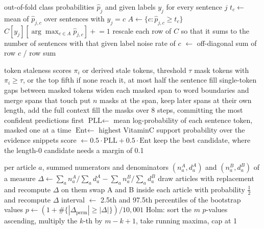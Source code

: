 \documentclass[]{paper}
\newcommand{\edit}{\textsc{edit}}
\begin{document}
\begin{algorithm}[H]
\caption{Confident-learning estimate of label noise, as reported in \texttt{audit/noise.json}.}
\label{alg:cl}
\begin{algorithmic}[1]
\Require out-of-fold class probabilities $\hat{p}_j$ and given labels $y_j$ for every sentence $j$
 $t_c \gets$ mean of $\hat{p}_{j,c}$ over sentences with $y_j = c$ \EndFor
{}
  \State $A \gets \{c : \hat{p}_{j,c} \ge t_c\}$
   $C[y_j][\arg\max_{c \in A} \hat{p}_{j,c}] \mathrel{+}= 1$ \EndIf
\EndFor
\State rescale each row of $C$ so that it sums to the number of sentences with that given label
 noise rate of $c$ $\gets$ off-diagonal sum of row $c$ / row sum \EndFor
\end{algorithmic}
\end{algorithm}

\begin{algorithm}[H]
\caption{Repair of one \edit{} sentence (\texttt{spans.policy\_spans}, \texttt{spans.snap}, \texttt{repair.repair\_sentence}).}
\label{alg:repair}
\begin{algorithmic}[1]
\Require token staleness scores $\pi_i$ or derived stale tokens, threshold $\tau$
\State mask tokens with $\pi_i \ge \tau$, or the top fifth if none reach it, at most half the sentence
\State fill single-token gaps between masked tokens
\State widen each masked span to word boundaries and merge spans that touch
    \State put $n$ masks at the span, keep later spans at their own length, add the full context
    \State fill the masks over 8 steps, committing the most confident predictions first
    \State $\text{PLL} \gets$ mean log-probability of each sentence token, masked one at a time
    \State $\text{Ent} \gets$ highest VitaminC support probability over the evidence snippets
    \State score $\gets 0.5 \cdot \text{PLL} + 0.5 \cdot \text{Ent}$
  \EndFor
  \State keep the best candidate, where the length-0 candidate needs a margin of 0.1
\EndFor
\end{algorithmic}
\end{algorithm}

\begin{algorithm}[H]
\caption{Paired tests over articles (\texttt{significance.test}, \texttt{significance.holm}).}
\label{alg:tests}
\begin{algorithmic}[1]
\Require per article $a$, summed numerators and denominators $(n^A_a, d^A_a)$ and $(n^B_a, d^B_a)$ of a measure
\State $\Delta \gets \sum_a n^A_a / \sum_a d^A_a - \sum_a n^B_a / \sum_a d^B_a$
  \State draw articles with replacement and recompute $\Delta$ on them 
  \State swap A and B inside each article with probability $\tfrac12$ and recompute $\Delta$ 
\EndFor
\State interval $\gets$ 2.5th and 97.5th percentiles of the bootstrap values
\State $p \gets (1 + \#\{|\Delta_{\text{perm}}| \ge |\Delta|\}) / 10{,}001$
\State Holm: sort the $m$ $p$-values ascending, multiply the $k$-th by $m - k + 1$, take running maxima, cap at 1
\end{algorithmic}
\end{algorithm}
\end{document}

